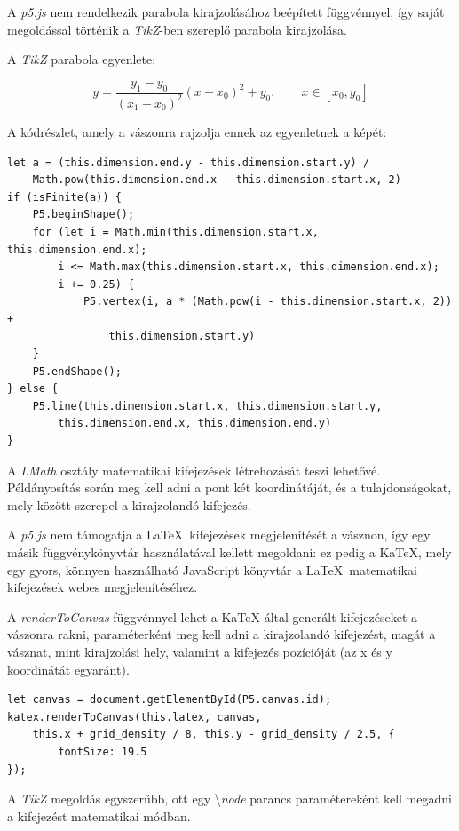 A \textit{p5.js} nem rendelkezik parabola kirajzolásához beépített függvénnyel, így saját megoldással történik a \textit{TikZ}-ben szereplő parabola kirajzolása. 

A \textit{TikZ} parabola egyenlete: 

$$\displaystyle y = \frac{y_1 - y_0}{(x_1 - x_0)^2}(x - x_0)^2 + y_0, \qquad x\in[x_0, y_0]$$

A kódrészlet, amely a vászonra rajzolja ennek az egyenletnek a képét:

\begin{lstlisting}[style=es6]
let a = (this.dimension.end.y - this.dimension.start.y) / 
    Math.pow(this.dimension.end.x - this.dimension.start.x, 2)
if (isFinite(a)) {
	P5.beginShape();
	for (let i = Math.min(this.dimension.start.x, this.dimension.end.x); 
	    i <= Math.max(this.dimension.start.x, this.dimension.end.x); 
	    i += 0.25) {
		    P5.vertex(i, a * (Math.pow(i - this.dimension.start.x, 2)) +
		        this.dimension.start.y)
	}
	P5.endShape();
} else {
	P5.line(this.dimension.start.x, this.dimension.start.y, 
	    this.dimension.end.x, this.dimension.end.y)
}
\end{lstlisting}


A \textit{LMath} osztály matematikai kifejezések létrehozását teszi lehetővé. Példányosítás során meg kell adni a pont két koordinátáját, és a tulajdonságokat, mely között szerepel a kirajzolandó kifejezés. 

A \textit{p5.js} nem támogatja a \LaTeX\ kifejezések megjelenítését a vásznon, így egy másik függvénykönyvtár használatával kellett megoldani: ez pedig a KaTeX{\cite{katex}}, mely egy gyors, könnyen használható JavaScript könyvtár a \LaTeX\ matematikai kifejezések webes megjelenítéséhez.

A \textit{renderToCanvas} függvénnyel lehet a KaTeX által generált kifejezéseket a vászonra rakni, paraméterként meg kell adni a kirajzolandó kifejezést, magát a vásznat, mint kirajzolási hely, valamint a kifejezés pozícióját (az x és y koordinátát egyaránt).

\begin{lstlisting}[style=es6]
let canvas = document.getElementById(P5.canvas.id);
katex.renderToCanvas(this.latex, canvas, 
    this.x + grid_density / 8, this.y - grid_density / 2.5, {
	    fontSize: 19.5
});
\end{lstlisting}

A \textit{TikZ} megoldás egyszerűbb, ott egy \textbackslash \textit{node} parancs paramétereként kell megadni a kifejezést matematikai módban.

